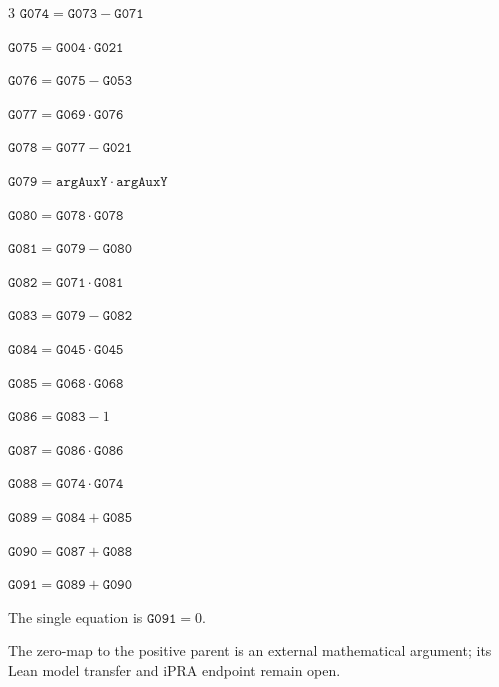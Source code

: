 \documentclass[10pt]{article}
\begin{document}
\begin{multicols}{3}
\noindent $\mathtt{G074}=\mathtt{G073}-\mathtt{G071}$\par
\noindent $\mathtt{G075}=\mathtt{G004}\cdot \mathtt{G021}$\par
\noindent $\mathtt{G076}=\mathtt{G075}-\mathtt{G053}$\par
\noindent $\mathtt{G077}=\mathtt{G069}\cdot \mathtt{G076}$\par
\noindent $\mathtt{G078}=\mathtt{G077}-\mathtt{G021}$\par
\noindent $\mathtt{G079}=\mathtt{argAuxY}\cdot \mathtt{argAuxY}$\par
\noindent $\mathtt{G080}=\mathtt{G078}\cdot \mathtt{G078}$\par
\noindent $\mathtt{G081}=\mathtt{G079}-\mathtt{G080}$\par
\noindent $\mathtt{G082}=\mathtt{G071}\cdot \mathtt{G081}$\par
\noindent $\mathtt{G083}=\mathtt{G079}-\mathtt{G082}$\par
\noindent $\mathtt{G084}=\mathtt{G045}\cdot \mathtt{G045}$\par
\noindent $\mathtt{G085}=\mathtt{G068}\cdot \mathtt{G068}$\par
\noindent $\mathtt{G086}=\mathtt{G083}-1$\par
\noindent $\mathtt{G087}=\mathtt{G086}\cdot \mathtt{G086}$\par
\noindent $\mathtt{G088}=\mathtt{G074}\cdot \mathtt{G074}$\par
\noindent $\mathtt{G089}=\mathtt{G084}+\mathtt{G085}$\par
\noindent $\mathtt{G090}=\mathtt{G087}+\mathtt{G088}$\par
\noindent $\mathtt{G091}=\mathtt{G089}+\mathtt{G090}$\par
\end{multicols}
The single equation is $\boxed{\mathtt{G091}=0}$.
\par\small The zero-map to the positive parent is an external mathematical argument; its Lean model transfer and iPRA endpoint remain open.
\end{document}
